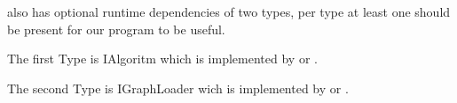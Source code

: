 \par

\basemodule[.main] also has optional runtime dependencies of two types, per type at least one should be present for our program to be useful.

The first Type is IAlgoritm which is implemented by  or .

The second Type is IGraphLoader wich is implemented by   or .
